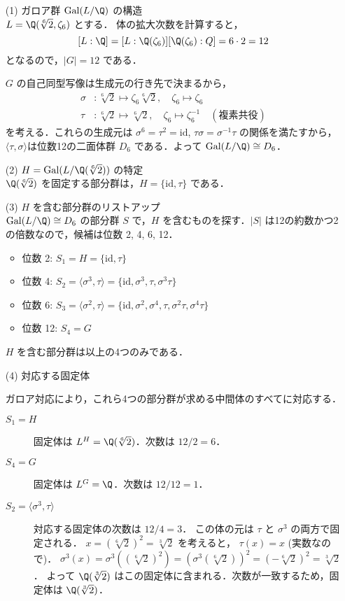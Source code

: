 \documentclass[a4paper,11pt]{ltjsarticle}
\begin{document}
\begin{itemize}
\item[(1)]ガロア群 $\mathrm{Gal}(L/\Q)$ の構造\\
$L = \Q(\sqrt[6]{2}, \zeta_6)$ とする．
体の拡大次数を計算すると，
\[
[L:\Q] = [L:\Q(\zeta_6)][\Q(\zeta_6):Q] = 6 \cdot 2 = 12
\]
となるので，$|G|=12$ である．

$G$ の自己同型写像は生成元の行き先で決まるから，
\begin{align*}
\sigma &: \sqrt[6]{2} \mapsto \zeta_6 \sqrt[6]{2}, \quad \zeta_6 \mapsto \zeta_6 \\
\tau &: \sqrt[6]{2} \mapsto \sqrt[6]{2}, \quad \zeta_6 \mapsto \zeta_6^{-1} \quad (\text{複素共役})
\end{align*}
を考える．これらの生成元は $\sigma^6 = \tau^2 = \text{id}$, $\tau\sigma = \sigma^{-1}\tau$ の関係を満たすから，$\langle \tau,\sigma\rangle$は位数12の二面体群 $D_6$ である．よって $\mathrm{Gal}(L/\Q) \cong D_6$．
\item[(2)]$H = \mathrm{Gal}(L/\Q(\sqrt[6]{2}))$ の特定\\
$\Q(\sqrt[6]{2})$ を固定する部分群は，$H = \{\text{id}, \tau\}$ である．
\item[(3)]$H$ を含む部分群のリストアップ\\
$\mathrm{Gal}(L/\Q) \cong D_6$ の部分群 $S$ で，$H$ を含むものを探す．$|S|$ は12の約数かつ2の倍数なので，候補は位数 2, 4, 6, 12．
\begin{itemize}
    \item 位数 2: $S_1 = H = \{\text{id}, \tau\}$
    \item 位数 4: $S_2 = \langle \sigma^3, \tau \rangle = \{\text{id}, \sigma^3, \tau, \sigma^3\tau\}$
    \item 位数 6: $S_3 = \langle \sigma^2, \tau \rangle = \{\text{id}, \sigma^2, \sigma^4, \tau, \sigma^2\tau, \sigma^4\tau\}$
    \item 位数 12: $S_4 = G$
\end{itemize}
$H$ を含む部分群は以上の4つのみである．
\item[(4)]対応する固定体\\
\item[] ガロア対応により，これら4つの部分群が求める中間体のすべてに対応する．
\begin{description}
    \item[$S_1=H$] 固定体は $L^H = \Q(\sqrt[6]{2})$．次数は $12/2=6$．
    \item[$S_4=G$] 固定体は $L^G = \Q$．次数は $12/12=1$．
    \item[$S_2=\langle \sigma^3, \tau \rangle$] 対応する固定体の次数は $12/4=3$．
    この体の元は $\tau$ と $\sigma^3$ の両方で固定される．
    $x = (\sqrt[6]{2})^2 = \sqrt[3]{2}$ を考えると，
    $\tau(x) = x$ (実数なので)．
    $\sigma^3(x) = \sigma^3((\sqrt[6]{2})^2) = (\sigma^3(\sqrt[6]{2}))^2 = (-\sqrt[6]{2})^2 = \sqrt[3]{2}$．
    よって $\Q(\sqrt[3]{2})$ はこの固定体に含まれる．次数が一致するため，固定体は $\Q(\sqrt[3]{2})$．


\end{description}
\end{itemize}
\end{document}
